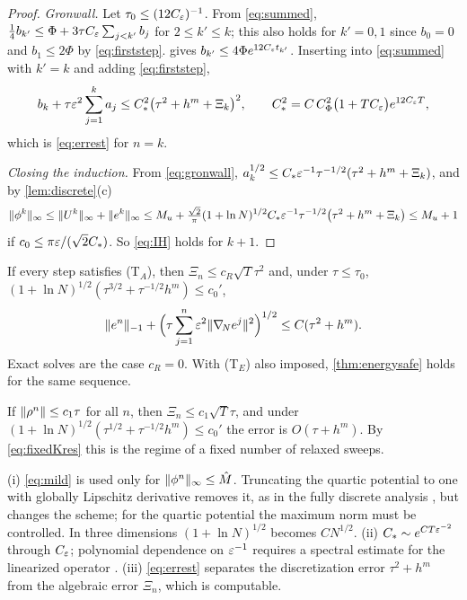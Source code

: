 \begin{proof}
\emph{Gronwall.} Let $\tau_0\le(12C_\varepsilon)^{-1}$. From \eqref{eq:summed}, $\frac14b_{k'}\le\Phi+3\tau C_\varepsilon\sum_{j<k'}b_j$ for $2\le k'\le k$; this also holds for $k'=0,1$ since $b_0=0$ and $b_1\le2\Phi$ by \eqref{eq:firststep}.  gives $b_{k'}\le4\Phi e^{12C_\varepsilon t_{k'}}$. Inserting into \eqref{eq:summed} with $k'=k$ and adding \eqref{eq:firststep},
\begin{equation}\label{eq:gronwall}
b_k+\tau\varepsilon^2\sum_{j=1}^ka_j\le C_*^2\big(\tau^2+h^m+\Xi_k\big)^2,\qquad C_*^2=C\,C_\Phi^2\big(1+TC_\varepsilon\big)e^{12C_\varepsilon T},
\end{equation}
which is \eqref{eq:errest} for $n=k$.

\emph{Closing the induction.} From \eqref{eq:gronwall}, $a_k^{1/2}\le C_*\varepsilon^{-1}\tau^{-1/2}(\tau^2+h^m+\Xi_k)$, and by \cref{lem:discrete}(c)
\[
\lVert \phi^k\rVert_\infty\le\lVert U^k\rVert_\infty+\lVert e^k\rVert_\infty\le M_u+\tfrac{\sqrt2}\pi(1+\ln N)^{1/2}C_*\varepsilon^{-1}\tau^{-1/2}\big(\tau^2+h^m+\Xi_k\big)\le M_u+1
\]
if $c_0\le\pi\varepsilon/(\sqrt2C_*)$. So \eqref{eq:IH} holds for $k+1$.
\end{proof}

\begin{corollary}\label{cor:TA}
If every step satisfies (T$_A$), then $\Xi_n\le c_R\sqrt T\tau^2$ and, under $\tau\le\tau_0$, $(1+\ln N)^{1/2}(\tau^{3/2}+\tau^{-1/2}h^m)\le c_0'$,
\[
\lVert e^n\rVert_{-1}+\Big(\tau\sum_{j=1}^n\varepsilon^2\lVert \nabla_{\!N} e^j\rVert^2\Big)^{1/2}\le C(\tau^2+h^m).
\]
Exact solves are the case $c_R=0$. With (T$_E$) also imposed, \cref{thm:energysafe} holds for the same sequence.
\end{corollary}

\begin{corollary}\label{cor:fixedK}
If $\lVert \rho^n\rVert\le c_1\tau$ for all $n$, then $\Xi_n\le c_1\sqrt T\tau$, and under $(1+\ln N)^{1/2}(\tau^{1/2}+\tau^{-1/2}h^m)\le c_0'$ the error is $O(\tau+h^m)$. By \eqref{eq:fixedKres} this is the regime of a fixed number of relaxed sweeps.
\end{corollary}

\begin{remark}\label{rem:error}
(i) \eqref{eq:mild} is used only for $\lVert \phi^n\rVert_\infty\le\hat M$. Truncating the quartic potential to one with globally Lipschitz derivative \cite{CondetteMelcherSuli2011} removes it, as in the fully discrete analysis \cite{ZhouWuWang2026}, but changes the scheme; for the quartic potential the maximum norm must be controlled. In three dimensions $(1+\ln N)^{1/2}$ becomes $CN^{1/2}$.
(ii) $C_*\sim e^{CT\varepsilon^{-2}}$ through $C_\varepsilon$; polynomial dependence on $\varepsilon^{-1}$ requires a spectral estimate for the linearized operator \cite{Chen1994,AlikakosFusco1993,FengProhl2004}.
(iii) \eqref{eq:errest} separates the discretization error $\tau^2+h^m$ from the algebraic error $\Xi_n$, which is computable.
\end{remark}
